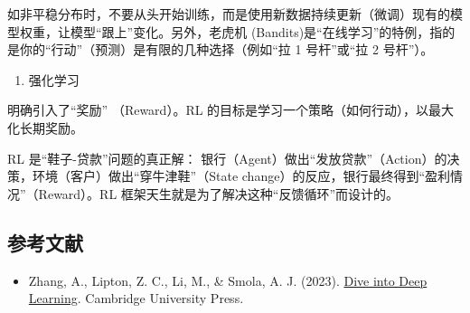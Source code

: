 如非平稳分布时，不要从头开始训练，而是使用新数据持续更新（微调）现有的模型权重，让模型``跟上''变化。另外，老虎机 (Bandits)是``在线学习''的特例，指的是你的``行动''（预测）是有限的几种选择（例如``拉 1 号杆''或``拉 2 号杆''）。

\begin{enumerate}
\def\labelenumi{\arabic{enumi}.}
\setcounter{enumi}{3}
\tightlist
\item
  强化学习
\end{enumerate}

明确引入了``奖励'' （Reward）。RL 的目标是学习一个策略（如何行动），以最大化长期奖励。

RL 是``鞋子-贷款''问题的真正解： 银行（Agent）做出``发放贷款''（Action）的决策，环境（客户）做出``穿牛津鞋''（State change）的反应，银行最终得到``盈利情况''（Reward）。RL 框架天生就是为了解决这种``反馈循环''而设计的。

\FloatBarrier
{}
\hypertarget{ux53c2ux8003ux6587ux732e-10}{%
\subsection{参考文献}\label{ux53c2ux8003ux6587ux732e-10}}

\vspace{0.25em}
\begin{itemize}
\tightlist
\item
  Zhang, A., Lipton, Z. C., Li, M., \& Smola, A. J. (2023). \href{https://D2L.ai}{Dive into Deep Learning}. Cambridge University Press.
\end{itemize}

\clearpage
